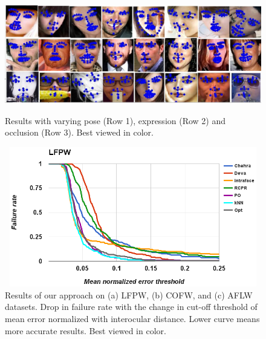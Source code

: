 \begin{figure}
  \centering
  \includegraphics[width=6in,height=2in]{fid/figures/pose_expression_occlusion.png}
  \caption{Results with varying pose (Row 1), expression (Row 2) and 
  occlusion (Row 3). Best viewed in color.}
  \label{fig:sample_results}
\end{figure}

\label{subsec:quant}

\begin{figure}[!ht]
  \centering
  \includegraphics[width=4.8in,height=2.4in]{fid/figures/lfpw_failure_rate_graph.png}
  \caption{Results of our approach on (a) LFPW, (b) COFW, and (c) AFLW datasets.
  Drop in failure rate with the change in cut-off threshold of mean error normalized 
  with interocular distance. Lower curve means more accurate results. Best viewed in color.}
  \label{fig:graph_results}
\end{figure}

